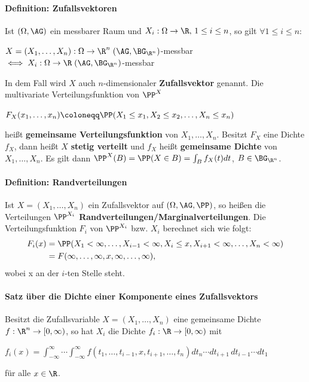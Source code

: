 \paragraph{Definition: Zufallsvektoren}
Ist $(\Omega,\AG)$ ein messbarer Raum und $X_i:\Omega\rightarrow\R,\,1\leq i\leq n$, so gilt $\forall1\leq i\leq n$:
\begin{tightcenter}
	$X=(X_1,\ldots,X_n):\Omega\rightarrow\R^n\;(\AG,\BG_{\R^n})$-messbar $\iff X_i:\Omega\rightarrow\R\;(\AG,\BG_{\R^n})$-messbar
\end{tightcenter}
In dem Fall wird $X$ auch $n$-dimensionaler \textbf{Zufallsvektor} genannt.
Die multivariate Verteilungsfunktion von $\PP^X$
\begin{tightcenter}
	$F_X(x_1,\ldots,x_n) \coloneqq\PP(X_1\leq x_1,X_2\leq x_2,\ldots,X_n\leq x_n)$
\end{tightcenter}
heißt \textbf{gemeinsame Verteilungsfunktion} von $X_1,\ldots,X_n$.
Besitzt $F_X$ eine Dichte $f_X$, dann heißt $X$ \textbf{stetig verteilt} und $f_X$ heißt \textbf{gemeinsame Dichte} von $X_1,\ldots,X_n$.
Es gilt dann $\PP^X(B)=\PP(X\in B)=\int_{B}f_X(t)dt$, \qquad$B\in\BG_{\R^n}$.

\paragraph{Definition: Randverteilungen}
Ist $X=(X_1,\ldots,X_n)$ ein Zufallsvektor auf $(\Omega,\AG,\PP)$, so heißen die Verteilungen $\PP^{X_i}$ \textbf{Randverteilungen/Marginalverteilungen}.
Die Verteilungsfunktion $F_i$ von $\PP^{X_i}$ bzw. $X_i$ berechnet sich wie folgt:
\begin{equation*}
	\begin{split}
		F_i(x) &= \PP(X_1<\infty,\ldots,X_{i-1}<\infty,X_i\leq x,X_{i+1}<\infty,\ldots,X_n<\infty) \\
		&= F(\infty,\ldots,\infty,x,\infty,\ldots,\infty),
	\end{split}
\end{equation*}	
wobei x an der $i$-ten Stelle steht.

\paragraph{Satz über die Dichte einer Komponente eines Zufallsvektors}
Besitzt die Zufallsvariable $X=(X_1,\ldots,X_n)$ eine gemeinsame Dichte $f:\R^n\rightarrow[0,\infty)$, so hat $X_i$ die Dichte $f_i:\R\rightarrow[0,\infty)$ mit
\begin{tightcenter}
	$f_i(x)=\int_{-\infty}^{\infty}\cdots\int_{-\infty}^{\infty}f(t_1,\ldots,t_{i-1},x,t_{i+1},\ldots,t_n)dt_n\cdots dt_{i+1}\,dt_{i-1}\cdots dt_1$
\end{tightcenter}
für alle $x\in\R$.

